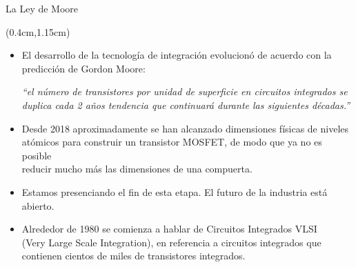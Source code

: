 \documentclass[table,dvipsnames,aspectratio=169]{beamer}
\begin{document}
 \begin{frame}{La Ley de Moore}
  \begin{textblock*}{\textwidth}(0.4cm,1.15cm)
   \begin{itemize}[<+(1)->] \justifying
    \item El desarrollo de la tecnología de integración evolucionó de acuerdo con la predicción de Gordon Moore:\\
    \begin{center}
    \textcolor{furfiGreen}{\textit{``el número de transistores por unidad de superficie en circuitos integrados se\\
    duplica cada 2 años tendencia que continuará durante las siguientes décadas.''}}
    \end{center}
    \item Desde 2018 aproximadamente se han alcanzado dimensiones físicas de niveles\\
    atómicos para construir un transistor MOSFET, de modo que ya no es posible\\
    reducir mucho más las dimensiones de una compuerta.
    \item \textcolor{furfiBlue}{Estamos presenciando el fin de esta etapa. El futuro de la industria está abierto.}
    \vspace{0.3cm}
    \item Alrededor de 1980 se comienza a hablar de Circuitos Integrados VLSI\\
    (Very Large Scale Integration), en referencia a circuitos integrados que\\
    contienen cientos de miles de transistores integrados.
   \end{itemize}
  \end{textblock*}
 \end{frame}
 
\end{document}
